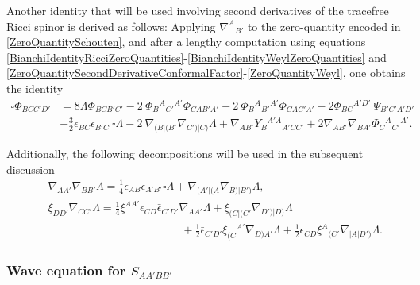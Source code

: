 \documentclass[10pt,a4paper]{article}
\theoremstyle{plain}
\begin{document}
\noindent Another identity that will be used involving second
derivatives of the tracefree Ricci spinor is derived as follows:
Applying $\nabla^{A}{}_{B'}$ to the zero-quantity encoded in
\eqref{ZeroQuantitySchouten}, and after a lengthy computation
using equations
\eqref{BianchiIdentityRicciZeroQuantities}-\eqref{BianchiIdentityWeylZeroQuantities}
and
\eqref{ZeroQuantitySecondDerivativeConformalFactor}-\eqref{ZeroQuantityWeyl}, one obtains 
the identity 
\begin{align}
\square \Phi_{BCC'D'} &=
8 \Lambda  \Phi_{BCB'C'} - 2 \
\Phi_{B}{}^{A}{}_{C'}{}^{A'} \Phi_{CAB'A'} - 2 \
\Phi_{B}{}^{A}{}_{B'}{}^{A'} \Phi_{CAC'A'} - 2 \Phi_{BC}{}^{A'D'} \
\Psi_{B'C'A'D'} \nonumber\\ 
& +\tfrac{3}{2}\epsilon_{BC}\bar{\epsilon}_{B'C'}\square  \Lambda- 2 \
\nabla_{(B|(B'}\nabla_{C')|C)}\Lambda
 + \nabla_{AB'}Y_{B}{}^{A'A}{}_{A'CC'} + 2 \nabla_{AB'}\nabla_{BA'}\Phi_{C}{}^{A}{}_{C'}{}^{A'} .
  \label{WaveEquationRicciSpinor}
\end{align}

\noindent Additionally, the following decompositions will be used in
the subsequent discussion
\begin{eqnarray}
&&\nabla_{AA'}\nabla_{BB'}\Lambda = \tfrac{1}{4} \epsilon_{AB}
  \bar{\epsilon }_{A'B'} \square \Lambda +
  \nabla_{(A'|(A}\nabla_{B)|B')}\Lambda , \\ &&\xi_{DD'}
  \nabla_{CC'}\Lambda = \tfrac{1}{4} \xi^{AA'} \epsilon_{CD}
  \bar{\epsilon}_{C'D'} \nabla_{AA'}\Lambda + \xi_{(C|(C'}
  \nabla_{D')|D)}\Lambda \nonumber \\ && \qquad \qquad \qquad
  \qquad\qquad \qquad + \tfrac{1}{2} \bar{\epsilon}_{C'D'}
  \xi_{(C}{}^{A'}\nabla_{D)A'}\Lambda + \tfrac{1}{2} \epsilon_{CD}
  \xi^{A}{}_{(C'}\nabla_{|A|D')}\Lambda .
\end{eqnarray}



\subsubsection{Wave equation for $S_{AA'BB'}$}
\end{document}
